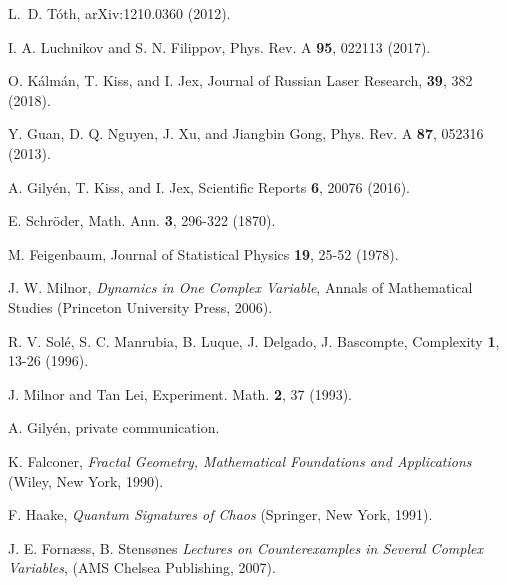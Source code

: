 \documentclass[%
 aip,
 amsmath,amssymb,
 reprint,%
]{revtex4-1}
\begin{document}
\begin{thebibliography}{99}
 L.~D. T\'{o}th, arXiv:1210.0360 (2012). 

 I. A. Luchnikov and S. N. Filippov, 
Phys. Rev. A {\bf 95}, 022113 (2017).

O. K\'alm\'an, T. Kiss, and I. Jex,  Journal of Russian Laser Research, {\bf 39}, 382 (2018). 

 Y. Guan, D. Q. Nguyen, J. Xu, and Jiangbin Gong,
Phys. Rev. A {\bf 87}, 052316 (2013).

A. Gily\'en, T. Kiss, and I. Jex, Scientific Reports {\bf 6}, 20076 (2016).  

E. Schr\" oder, %
Math. Ann. {\bf 3}, 296-322  (1870).

M. Feigenbaum, 
Journal of Statistical Physics {\bf 19}, 25-52 (1978).

J. W. Milnor,  {\it Dynamics in One Complex Variable},  Annals of Mathematical Studies (Princeton University Press, 2006).

R. V. Sol\'{e}, S. C. Manrubia, B. Luque,  J. Delgado, J. Bascompte,
Complexity {\bf 1}, 13-26 (1996).

 J. Milnor and Tan Lei,
  Experiment. Math. {\bf 2}, 37 (1993).
 
A. Gily\'{e}n, private communication.

K. Falconer, {\it Fractal Geometry, Mathematical Foundations and Applications} (Wiley, New York, 1990).

F. Haake, {\it Quantum Signatures of Chaos} (Springer, New York, 1991).


J. E. Forn\ae{}ss, B. Stens\o{}nes  {\it Lectures on Counterexamples in Several Complex Variables},  (AMS Chelsea Publishing, 2007).

\end{thebibliography}

\end{document}
